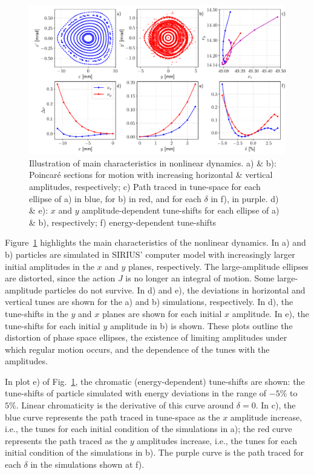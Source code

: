 \begin{figure}
    \centering
    \includegraphics[width=\textwidth]{Images/nonlinear_dynamics_phase_tunes.pdf}
    \caption[Illustration of main characteristics in nonlinear dynamics]{Illustration of main characteristics in nonlinear dynamics. a) \& b): Poincaré sections for motion with increasing horizontal \& vertical amplitudes, respectively; c) Path traced in tune-space for each ellipse of a) in blue, for b) in red, and for each $\delta$ in f), in purple. d) \& e): $x$ and $y$ amplitude-dependent tune-shifts for each ellipse of a) \& b), respectively; f) energy-dependent tune-shifts}
    \label{fig:tune_shifts}
\end{figure}

Figure~\ref{fig:tune_shifts} highlights the main characteristics of the nonlinear dynamics. In a) and b) particles are simulated in SIRIUS' computer model with increasingly larger initial amplitudes in the $x$ and $y$ planes, respectively. The large-amplitude ellipses are distorted, since the action $J$ is no longer an integral of motion. Some large-amplitude particles do not survive. In d) and e), the deviations in horizontal and vertical tunes are shown for the a) and b) simulations, respectively. In d), the tune-shifts in the $y$ and $x$ planes are shown for each initial $x$ amplitude. In e), the tune-shifts for each initial $y$ amplitude in b) is shown. These plots outline the distortion of phase space ellipses, the existence of limiting amplitudes under which regular motion occurs, and the dependence of the tunes with the amplitudes.

In plot e) of Fig.~\ref{fig:tune_shifts}, the chromatic (energy-dependent) tune-shifts are shown: the tune-shifts of particle simulated with energy deviations in the range of $-5\%$ to $5\%$. Linear chromaticity is the derivative of this curve around $\delta=0$. In c), the blue curve represents the path traced in tune-space as the $x$ amplitude increase, i.e., the tunes for each initial condition of the simulations in a); the red curve represents the path traced as the $y$ amplitudes increase,  i.e., the tunes for each initial condition of the simulations in b). The purple curve is the path traced for each $\delta$ in the simulations shown at f).
